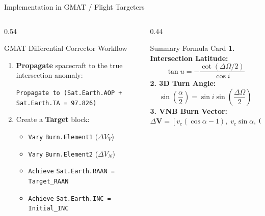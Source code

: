 \documentclass[aspectratio=169,10pt]{beamer}
\begin{document}
\begin{frame}{Implementation in GMAT / Flight Targeters}
    \begin{columns}[t]
        \begin{column}{0.54\textwidth}
            \begin{block}{GMAT Differential Corrector Workflow}
                \scriptsize
                \begin{enumerate}\setlength{\itemsep}{2pt}
                    \item \textbf{Propagate} spacecraft to the true intersection anomaly:
                    \begin{center}
                        \texttt{Propagate to (Sat.Earth.AOP + Sat.Earth.TA = 97.826)}
                    \end{center}
                    \item Create a \textbf{Target} block:
                    \begin{itemize}\setlength{\itemsep}{1pt}
                        \item \texttt{Vary} \texttt{Burn.Element1} ($\Delta V_V$)
                        \item \texttt{Vary} \texttt{Burn.Element2} ($\Delta V_N$)
                        \item \texttt{Achieve} \texttt{Sat.Earth.RAAN = Target\_RAAN}
                        \item \texttt{Achieve} \texttt{Sat.Earth.INC = Initial\_INC}
                    \end{itemize}
                \end{enumerate}
            \end{block}
        \end{column}
        
        \begin{column}{0.44\textwidth}
            \begin{exampleblock}{Summary Formula Card}
                \scriptsize
                \textbf{1. Intersection Latitude:}
                \vspace{-0.1cm}
                $$\tan u = -\frac{\cot(\Delta\Omega / 2)}{\cos i}$$
                \textbf{2. 3D Turn Angle:}
                \vspace{-0.1cm}
                $$\sin\left(\frac{\alpha}{2}\right) = \sin i \sin\left(\frac{\Delta\Omega}{2}\right)$$
                \textbf{3. VNB Burn Vector:}
                \vspace{-0.1cm}
                $$\Delta \mathbf{V} = [v_c(\cos\alpha - 1), \; v_c \sin\alpha, \; 0]^T$$
            \end{exampleblock}
        \end{column}
    \end{columns}
\end{frame}
\end{document}
